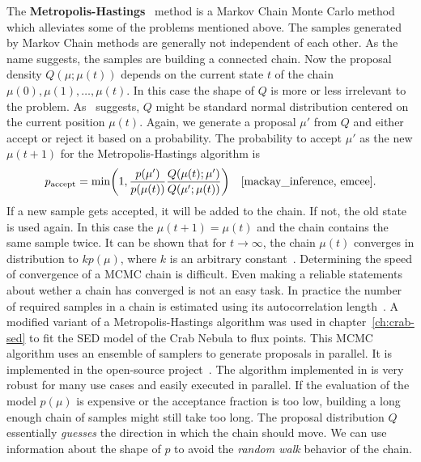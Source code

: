 The \textbf{Metropolis-Hastings}~\cite{metropolis, hastings} method is a Markov Chain Monte Carlo method which
alleviates some of the problems mentioned above. The samples generated by Markov Chain methods 
are generally not independent of each other. 
As the name suggests, the samples are building a connected chain. 
Now the proposal density $Q\left(\mu; \mu(t)\right)$ depends on the current state $t$ of the chain $\mu(0), \mu(1), \ldots, \mu(t)$.
In this case the shape of $Q$ is more or less irrelevant to the problem. As~\cite[365]{mackay_inference} suggests, $Q$ might be 
standard normal distribution centered on the current position $\mu(t)$.  Again, we generate a proposal $\mu'$ from $Q$ and either accept or reject it based on a probability.
The probability to accept $\mu'$ as the new $\mu(t+1)$ for the Metropolis-Hastings algorithm is 
\begin{equation}
  \label{eq:metropolis_step}
  p_{\text{accept}} = \min\left(1, \frac{p(\mu')}{p(\mu(t))} \frac{Q\left(\mu(t); \mu' \right)}{Q\left(\mu'; \mu(t)\right)} \right)\quad\text{\cite[366]{mackay_inference, emcee}}.
\end{equation}
If a new sample gets accepted, it will be added to the chain. If not, the old state is used again.
In this case the $\mu(t + 1) = \mu(t)$ and the chain contains the same sample twice. 
It can be shown that for $t \rightarrow \infty$, the chain $\mu(t)$ converges in distribution
to $k p(\mu)$, where $k$ is an arbitrary constant~\cite[S.21]{markov_mixing_levin}.
Determining the speed of convergence of a MCMC chain is difficult. 
Even making a reliable statements about wether a chain has converged is not an easy 
task. In practice the number of required samples in a chain is estimated using its autocorrelation length~\cite[S.3]{emcee}. 
A modified variant of a Metropolis-Hastings algorithm was used in chapter~\ref{ch:crab-sed} to fit the SED model of the Crab Nebula to 
flux points. This MCMC algorithm uses an ensemble of samplers to generate proposals in parallel. It is implemented in the open-source 
\emcee project~\cite{emcee}. 
The algorithm implemented in \emcee is very robust for many use cases and easily executed in parallel.
If the evaluation of the model $p(\mu)$ is expensive or the acceptance fraction is too low, 
building a long enough chain of samples might still take too long. The proposal distribution $Q$ essentially
\emph{guesses} the direction in which the chain should move.
We can use information about the shape of $p$ to avoid  the \emph{random walk} behavior of the chain.


